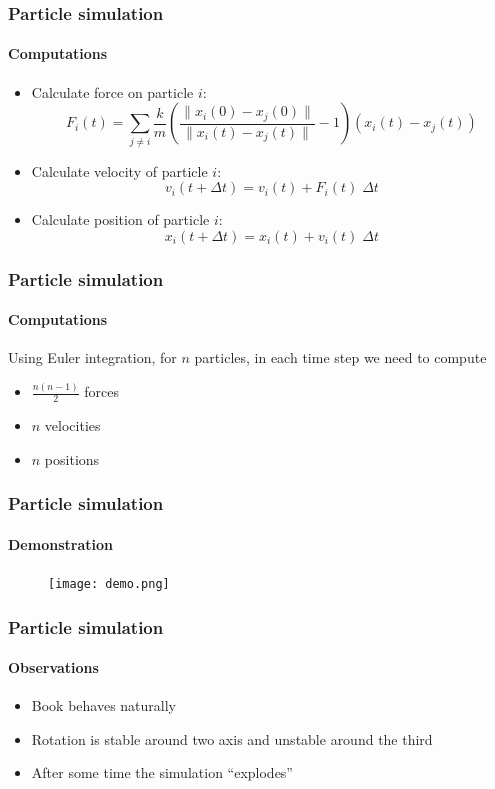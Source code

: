 \documentclass{beamer}
\begin{document}
\begin{frame}
 \frametitle{Particle simulation}
 \framesubtitle{Computations}
 \begin{itemize}
  \item Calculate force on particle $i$:
  \begin{displaymath}
   F_i(t) = \sum_{j \neq i} \frac{k}{m} \left( \frac{\|x_i(0) - x_j(0)\|}{\|x_i(t) - x_j(t)\|} - 1\right) \left(x_i(t) - x_j(t)\right)
  \end{displaymath}
  \item Calculate velocity of particle $i$:
  \begin{displaymath}
   v_i(t + \Delta t) = v_i(t) + F_i(t) \; \Delta t
  \end{displaymath}
  \item Calculate position of particle $i$:
  \begin{displaymath}
   x_i(t + \Delta t) = x_i(t) + v_i(t) \; \Delta t
  \end{displaymath}
 \end{itemize}
\end{frame}

\begin{frame}
 \frametitle{Particle simulation}
 \framesubtitle{Computations}
 Using Euler integration, for $n$ particles, in each time step we need to compute
 \begin{itemize}
  \item $\frac{n(n-1)}{2}$ forces
  \item $n$ velocities
  \item $n$ positions
 \end{itemize}
\end{frame}

\begin{frame}
 \frametitle{Particle simulation}
 \framesubtitle{Demonstration}
 \begin{figure}
  \centering
  \texttt{[image: demo.png]}
 \end{figure}
\end{frame}

\begin{frame}
 \frametitle{Particle simulation}
 \framesubtitle{Observations}
 \begin{itemize}
  \item Book behaves naturally
  \item Rotation is stable around two axis and unstable around the third
  \item After some time the simulation ``explodes''
 \end{itemize}
\end{frame}
\end{document}
